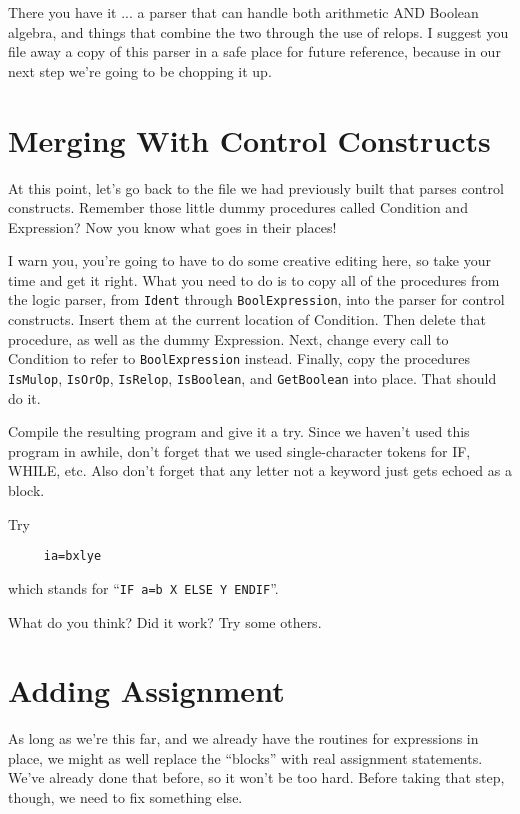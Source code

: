 There you have it ... a parser that can  handle  both  arithmetic AND Boolean algebra, and things  that combine the two through the use of relops. I suggest you file away a copy of this parser in a safe place for future reference, because in our next step we're going to be chopping it up.

\section{Merging With Control Constructs}

At this point, let's go back to the file we had  previously built that parses control  constructs. Remember  those  little dummy procedures called Condition and  Expression?    Now you know what goes in their places!

I  warn you, you're going to have to  do  some  creative  editing here, so take your time and get it right. What you need to do is to copy all of  the  procedures from the logic parser, from {\tt Ident} through  {\tt BoolExpression}, into the parser for control  constructs. Insert  them  at  the current location of Condition. Then delete that  procedure, as  well as the dummy Expression. Next, change every call  to  Condition  to  refer  to  {\tt BoolExpression} instead. Finally, copy the procedures {\tt IsMulop}, {\tt IsOrOp}, {\tt IsRelop}, {\tt IsBoolean}, and {\tt GetBoolean} into place. That should do it.

Compile  the  resulting program and give it  a  try. Since  we haven't  used  this  program in awhile, don't forget that we used single-character tokens for IF, WHILE, etc. Also don't forget that any letter not a keyword just gets echoed as a block.

Try

\begin{verbatim}
     ia=bxlye
\end{verbatim}

which stands for ``\verb|IF a=b X ELSE Y ENDIF|''.

What do you think?  Did it work?  Try some others.

\section{Adding Assignment}

As long as we're this far, and  we already have the routines for expressions in place, we might  as well replace the ``blocks'' with real assignment statements. We've already done that before, so it won't be too hard. Before  taking that step, though, we need to fix something else.

